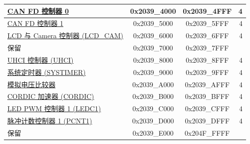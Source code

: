 \begin{ThreePartTable}
\begin{longtable}[c]{ |p{7cm}|c|c|r| }
    \hyperref[mod:twai]{CAN FD 控制器 0} & 0x2039\_4000 & 0x2039\_4FFF &   4\\\hline
    \hyperref[mod:twai]{CAN FD 控制器 1} & 0x2039\_5000 & 0x2039\_5FFF &   4\\\hline
    \hyperref[mod:camlcdctrl]{LCD 与 Camera 控制器 (LCD\_CAM)} & 0x2039\_6000 & 0x2039\_6FFF &   4\\\hline
        \rowcolor{gray!25}  保留          & 0x2039\_7000 & 0x2039\_7FFF &    \\\hline
    \hyperref[mod:uart]{UHCI 控制器 (UHCI)}          & 0x2039\_8000 & 0x2039\_8FFF &   4\\\hline
    \hyperref[mod:systimer]{系统定时器 (SYSTIMER)} & 0x2039\_9000 & 0x2039\_9FFF &   4\\\hline
    \hyperref[mod:anacom]{模拟电压比较器} & 0x2039\_A000 & 0x2039\_AFFF &   4\\\hline
    \hyperref[mod:cordic]{CORDIC 加速器 (CORDIC)} & 0x2039\_B000 & 0x2039\_BFFF &   4\\\hline
    \hyperref[mod:ledpwm]{LED PWM 控制器 1 (LEDC1)} & 0x2039\_C000 & 0x2039\_CFFF &   4\\\hline
    \hyperref[mod:pcnt]{脉冲计数控制器 1 (PCNT1)} & 0x2039\_D000 & 0x2039\_DFFF &   4\\\hline
        \rowcolor{gray!25}  保留          & 0x2039\_E000 & 0x204F\_FFFF &    \\\hline


\end{longtable}
\end{ThreePartTable}
